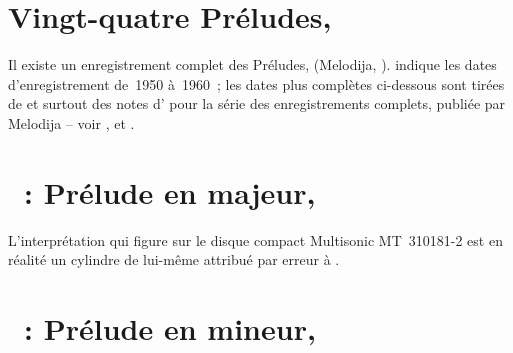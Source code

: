 \section*{%
Vingt-quatre Préludes, }

Il existe un enregistrement complet des Préludes,  (Melodija,
).
\FMalik{} \citep[voir][p.~72]{Malik} indique les dates d'enregistrement
de~1950 à~1960~; les dates plus complètes ci-dessous sont tirées de
\citet{Masuda} et surtout des notes d'\INikonovich{} pour la série des
enregistrements complets, publiée par Melodija -- voir
\citet[vol.~10]{Nikonovich79}, \citet[p.~\hbox{8-9}]{Nikonovich11} et
\citet[p.~382]{Scriabine}.

\section{\ifChrono \Scriabine{}~: \fi
Prélude en \kC majeur,  }
\label{\thesection}

L'interprétation qui figure sur le disque compact Multisonic
MT~310181-2 est en réalité un cylindre de \Scriabine{} lui-même attribué par
erreur à \VSofronitsky{} \citep[voir][p.~72 et note~8]{Malik}.

\begin{workitemize}
 \item{}
 \begin{perfitemize}
  \item{}
  \item{}
 \end{perfitemize}
\end{workitemize}

\section{\ifChrono \Scriabine{}~: \fi
Prélude en \kA mineur,  }
\label{\thesection}

